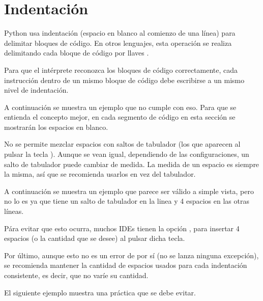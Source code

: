
\section{Indentación}

Python usa indentación (espacio en blanco al comienzo de una línea) para delimitar bloques de código.
En otros lenguajes, esta operación se realiza delimitando cada bloque de código por llaves \ttt{\{\}}.
\medskip

Para que el intérprete reconozca los bloques de código correctamente, cada instrucción dentro de un mismo bloque de código debe escribirse a un mismo nivel de indentación.
\medskip

A continuación se muestra un ejemplo que no cumple con eso.
Para que se entienda el concepto mejor, en cada segmento de código en esta sección se mostrarán los espacios en blanco.


No se permite mezclar espacios con saltos de tabulador (los que aparecen al pulsar la tecla ).
Aunque se vean igual, dependiendo de las configuraciones, un salto de tabulador puede cambiar de medida.
La medida de un espacio es siempre la misma, así que se recomienda usarlos en vez del tabulador.
\medskip

A continuación se muestra un ejemplo que parece ser válido a simple vista, pero no lo es ya que tiene un salto de tabulador en la linea  y 4 espacios en las otras líneas.


Pára evitar que esto ocurra, muchos IDEs tienen la opción , para insertar 4 espacios (o la cantidad que se desee) al pulsar dicha tecla.
\medskip

Por último, aunque esto no es un error de por sí (no se lanza ninguna excepción), se recomienda mantener la cantidad de espacios usados para cada indentación consistente, es decir, que no varíe su cantidad.
\medskip

El siguiente ejemplo muestra una práctica que se debe evitar.


